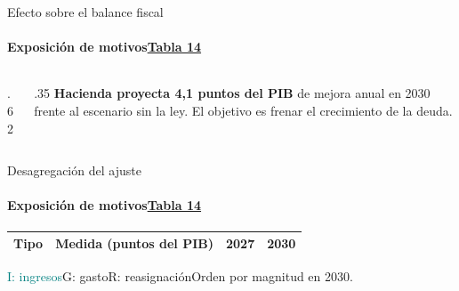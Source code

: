 \documentclass[aspectratio=169,11pt]{beamer}
\newcommand{\src}[1]{\par\vfill{\fontsize{7.3}{8.4}\selectfont\color{muted}#1\par}}
\newcommand{\ley}[2]{\href{https://www.camara.gov.co/wp-content/uploads/2026/10/proyectos-ley/documentos/proyecto-36548/PROYECTO-DE-LEY-Rescate-Economico-2026-VSD-RADICADA-1.pdf\#page=#1}{#2}}
\begin{document}
\begin{frame}{Efecto sobre el balance fiscal}
\framesubtitle{Exposición de motivos\quad \ley{204}{Tabla 14}}
\begin{columns}[T]
\begin{column}{.62\textwidth}
\end{column}
\begin{column}{.35\textwidth}
\vspace{6mm}
\textbf{Hacienda proyecta 4,1 puntos del PIB} de mejora anual en 2030 frente al escenario sin la ley. El objetivo es frenar el crecimiento de la deuda.
\end{column}
\end{columns}
\end{frame}

\begin{frame}{Desagregación del ajuste}
\framesubtitle{Exposición de motivos\quad \ley{204}{Tabla 14}}
\centering
{\fontsize{9.5}{11.4}\selectfont\renewcommand{\arraystretch}{0.87}
\begin{tabular}{clrr}
\toprule
\textbf{Tipo} & \textbf{Medida (puntos del PIB)} & \textbf{2027} & \textbf{2030}\\
\midrule

\end{tabular}}
\par
{\footnotesize\textcolor{teal}{I: ingresos}\quad\textcolor{rust}{G: gasto}\quad\textcolor{muted}{R: reasignación}\quad Orden por magnitud en 2030.}\par
\end{frame}
\end{document}
